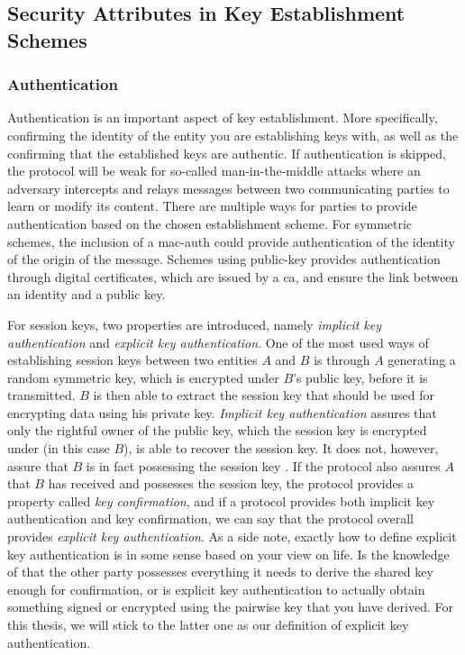 \subsection{Security Attributes in Key Establishment Schemes}
\label{sec:attributes}


\subsubsection{Authentication}

Authentication is an important aspect of key establishment. More specifically, confirming the identity of the entity you are establishing keys with, as well as the confirming that the established keys are authentic. If authentication is skipped, the protocol will be weak for so-called man-in-the-middle attacks where an adversary intercepts and relays messages between two communicating parties to learn or modify its content. There are multiple ways for parties to provide authentication based on the chosen establishment scheme. For symmetric schemes, the inclusion of a \gls{mac-auth} could provide authentication of the identity of the origin of the message. Schemes using public-key provides authentication through digital certificates, which are issued by a \gls{ca}, and ensure the link between an identity and a public key.

For session keys, two properties are introduced, namely \emph{implicit key authentication} and \emph{explicit key authentication}. One of the most used ways of establishing session keys between two entities $A$ and $B$ is through $A$ generating a random symmetric key, which is encrypted under $B$'s public key, before it is transmitted. $B$ is then able to extract the session key that should be used for encrypting data using his private key. \emph{Implicit key authentication} assures that only the rightful owner of the public key, which the session key is encrypted under (in this case $B$), is able to recover the session key. It does not, however, assure that $B$ is in fact possessing the session key \cite{hankerson2006guide}. If the protocol also assures $A$ that $B$ has received and possesses the session key, the protocol provides a property called \emph{key confirmation}, and if a protocol provides both implicit key authentication and key confirmation, we can say that the protocol overall provides \emph{explicit key authentication}. As a side note, exactly how to define explicit key authentication is in some sense based on your view on life. Is the knowledge of that the other party possesses everything it needs to derive the shared key enough for confirmation, or is explicit key authentication to actually obtain something signed or encrypted using the pairwise key that you have derived. For this thesis, we will stick to the latter one as our definition of explicit key authentication. 


